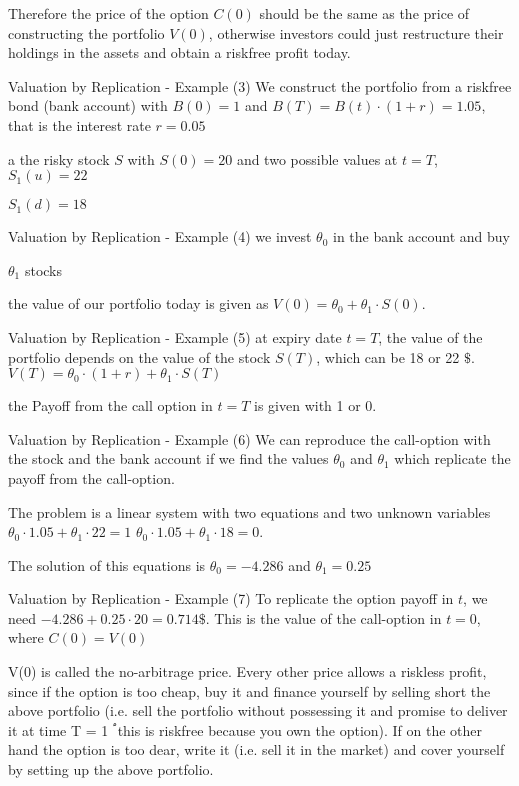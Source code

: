 	Therefore the price of the option $C(0)$ should be the same
	as the price of constructing the portfolio $V(0)$, otherwise investors
	could just restructure their holdings in the assets and obtain a
	riskfree profit today.


Valuation by Replication - Example (3)
	We construct the portfolio from
		a riskfree bond (bank account) with $B(0)=1$ and $B(T)=B(t) \cdot (1+r) = 1.05$, that is the interest rate $r=0.05$
		
		a the risky stock $S$ with $S(0) = 20$ and two possible values at $t=T$,
			$S_1(u)=22$
 
			$S_1(d)=18$


Valuation by Replication - Example (4)
	we invest $\theta_0$ in the bank account and buy
	
	$\theta_1$ stocks
  
	the value of our portfolio today is given as
		$V(0) = \theta_0 + \theta_1 \cdot S(0)$.
  

Valuation by Replication - Example (5)
	at expiry date $t=T$, the value of the portfolio depends on the value of the stock $S(T)$, which can be 18 or 22 $\$$.
		$V(T) = \theta_0 \cdot (1+r) + \theta_1 \cdot S(T)$
  
  the Payoff from the call option in $t=T$ is given with 1 or 0.
 

Valuation by Replication - Example (6)
	We can reproduce the call-option with the stock and the bank account if we find the 
	values $\theta_0$ and $\theta_1$ which replicate the payoff from the call-option.
	
  The problem is a linear system with two equations and two unknown variables
		$\theta_0 \cdot 1.05 + \theta_1 \cdot 22 = 1$
    $\theta_0 \cdot 1.05 + \theta_1 \cdot 18 = 0$.
    
  The solution of this equations is $\theta_0 = -4.286$ and $\theta_1 = 0.25$


Valuation by Replication - Example (7)
	To replicate the option payoff in $t$, we need $-4.286+0.25 \cdot 20 = 0.714 \$$. This is the value
	of the call-option in $t=0$, where $C(0)=V(0)$
	
	V(0) is called the no-arbitrage price. Every other price allows a
	riskless profit, since if the option is too cheap, buy it and
	finance yourself by selling short the above portfolio (i.e. sell the
	portfolio without possessing it and promise to deliver it at time
	T = 1 ֠ this is riskfree because you own the option). If on the
	other hand the option is too dear, write it (i.e. sell it in the
	market) and cover yourself by setting up the above portfolio.


